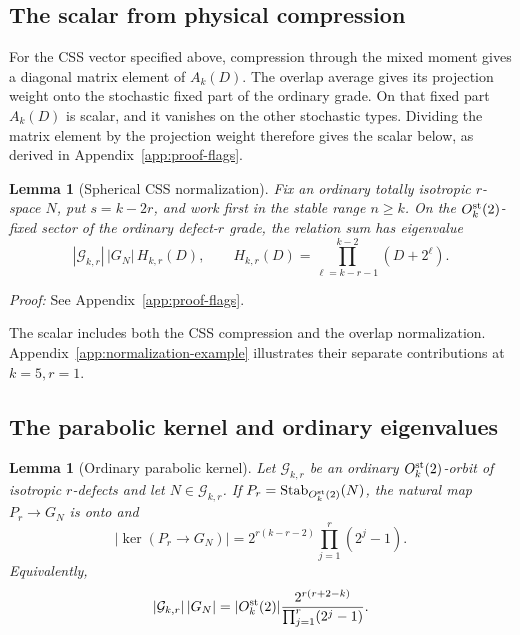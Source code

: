 \documentclass[journal,twocolumn]{IEEEtran}
\newtheorem{lemma}[theorem]{Lemma}
\theoremstyle{definition}
\theoremstyle{plain}
\newcommand{\cG}{\mathcal G}
\begin{document}
\subsection{The scalar from physical compression}
For the CSS vector specified above, compression through the mixed moment
gives a diagonal matrix element of $A_k(D)$.  The overlap average gives
its projection weight onto the stochastic fixed part of the ordinary
grade.  On that fixed part $A_k(D)$ is scalar, and it vanishes on the
other stochastic types.  Dividing the matrix element by the projection
weight therefore gives the scalar below, as derived in
Appendix~\ref{app:proof-flags}.

\begin{lemma}[Spherical CSS normalization]
\label{lemS:flags}
Fix an ordinary totally isotropic $r$-space $N$, put $s=k-2r$, and work
first in the stable range $n\geq k$.  On the
$O_k^{\rm st}(2)$-fixed sector of the ordinary defect-$r$ grade, the relation
sum has eigenvalue
\begin{equation}
 |\cG_{k,r}|\,|G_N|\,H_{k,r}(D),
 \qquad
 H_{k,r}(D)=\prod_{\ell=k-r-1}^{k-2}(D+2^\ell).
 \label{eqS:H}
\end{equation}
\end{lemma}

\noindent\emph{Proof:} See Appendix~\ref{app:proof-flags}.\par

The scalar includes both the CSS compression and the overlap
normalization.  Appendix~\ref{app:normalization-example} illustrates
their separate contributions at $k=5,r=1$.

\subsection{The parabolic kernel and ordinary eigenvalues}
\begin{lemma}[Ordinary parabolic kernel]
\label{lemS:parabolic}
Let $\cG_{k,r}$ be an ordinary $O_k^{\rm st}(2)$-orbit of isotropic
$r$-defects and let $N\in\cG_{k,r}$.  If
$P_r=\operatorname{Stab}_{O_k^{\rm st}(2)}(N)$, the natural map
$P_r\to G_N$ is onto and
\begin{equation}
 |\ker(P_r\to G_N)|
 =2^{r(k-r-2)}\prod_{j=1}^{r}(2^j-1).
 \label{eqS:kernel}
\end{equation}
Equivalently,
\begin{equation}
 |\cG_{k,r}|\,|G_N|
 =|O_k^{\rm st}(2)|
 \frac{2^{r(r+2-k)}}{\prod_{j=1}^{r}(2^j-1)}.
 \label{eqS:orbit-product}
\end{equation}
\end{lemma}
\end{document}
